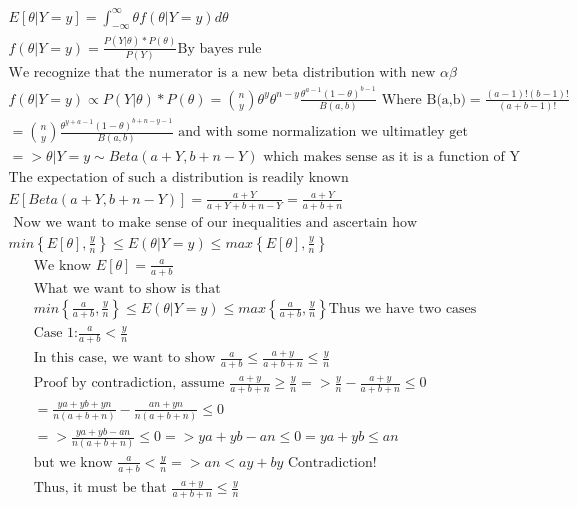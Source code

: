 \documentclass[11pt]{article}
\begin{document}
\begin{enumerate}
\begin{enumerate}
	\begin{gather}
		E[\theta|Y=y] = \int_{-\infty}^{\infty} \theta f(\theta|Y=y) d\theta\\
		f(\theta|Y=y)=\frac{P(Y|\theta) * P(\theta)}{P(Y)} \text{By bayes rule}\\
		\text{We recognize that the numerator is a new beta distribution with new } \alpha \beta\\
		f(\theta|Y=y) \propto P(Y|\theta) * P(\theta) = \binom{n}{y}\theta^y\theta^{n-y} \frac{\theta^{a-1}(1-\theta)^{b-1}}{B(a,b)} \text{ Where B(a,b)} = \frac{(a-1)!(b-1)!}{(a+b-1)!}\\
		= \binom{n}{y}\frac{\theta^{y+a-1}(1-\theta)^{b+n-y-1}}{B(a,b)} \text{ and with some normalization we ultimatley get }\\
		=> \theta|Y=y \sim Beta(a+Y,b+n-Y) \text{ which makes sense as it is a function of Y}\\
		\text{The expectation of such a distribution is readily known}\\
		E[Beta(a+Y,b+n-Y)] = \frac{a+Y}{a+Y+b+n-Y} = \frac{a+Y}{a+b+n}\\
		\text{ Now we want to make sense of our inequalities and ascertain how }	\\
		min\left\{E[\theta],\frac{y}{n}\right\}\le E(\theta | Y = y) \le max\left\{E[\theta],\frac{y}{n}\right\}
				\end{gather}
				\begin{gather}
		\text{We know } E[\theta] = \frac{a}{a+b}\\
		\text{What we want to show is that } \\
		min\left\{\frac{a}{a+b},\frac{y}{n}\right\}\le E(\theta | Y = y) \le max\left\{\frac{a}{a+b},\frac{y}{n}\right\}
		\text{Thus we have two cases}\\
		\text{Case 1:} \frac{a}{a+b}<\frac{y}{n}\\
		\text{In this case, we want to show } \frac{a}{a+b}\le\frac{a+y}{a+b+n}\le\frac{y}{n}\\
		\text{Proof by contradiction, assume }\frac{a+y}{a+b+n}\ge\frac{y}{n} => \frac{y}{n}-\frac{a+y}{a+b+n}\le 0\\
		= \frac{ya+yb+yn}{n(a+b+n)}-\frac{an+yn}{n(a+b+n)} \le 0\\
		 => \frac{ya+yb-an}{n(a+b+n)}\le 0=>ya+yb-an\le 0 = ya+yb \le an\\
		\text{but we know } \frac{a}{a+b}<\frac{y}{n} => an < ay+by \text{  Contradiction!}\\
		\text{Thus, it must be that }\frac{a+y}{a+b+n}\le\frac{y}{n}\\

\end{gather}
\end{enumerate}
\end{enumerate}
\end{document}
